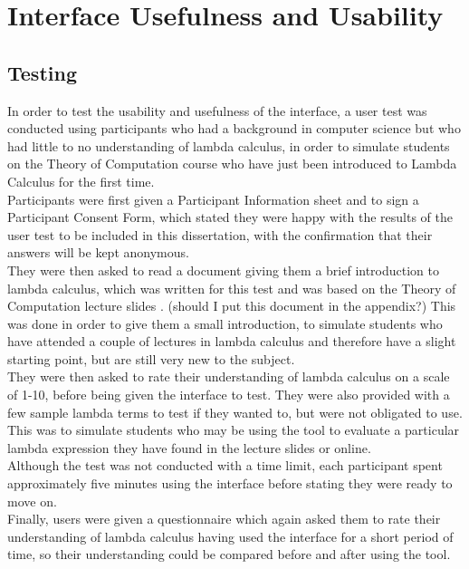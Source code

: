 \documentclass[a4paper,12pt]{report}
\begin{document}
\section{Interface Usefulness and Usability}
\label{interface usefulness and usability}
\subsection{Testing}

In order to test the usability and usefulness of the interface, a user test was conducted using participants who had a background in computer science but who had little to no understanding of lambda calculus, in order to simulate students on the Theory of Computation course who have just been introduced to Lambda Calculus for the first time.\\

Participants were first given a Participant Information sheet and to sign a Participant Consent Form, which stated they were happy with the results of the user test to be included in this dissertation, with the confirmation that their answers will be kept anonymous.\\

They were then asked to read a document giving them a brief introduction to lambda calculus, which was written for this test and was based on the Theory of Computation lecture slides \cite{Gay2019}. (should I put this document in the appendix?) This was done in order to give them a small introduction, to simulate students who have attended a couple of lectures in lambda calculus and therefore have a slight starting point, but are still very new to the subject.\\

They were then asked to rate their understanding of lambda calculus on a scale of 1-10, before being given the interface to test. They were also provided with a few sample lambda terms to test if they wanted to, but were not obligated to use. This was to simulate students who may be using the tool to evaluate a particular lambda expression they have found in the lecture slides or online.\\

Although the test was not conducted with a time limit, each participant spent approximately five minutes using the interface before stating they were ready to move on.\\

Finally, users were given a questionnaire which again asked them to rate their understanding of lambda calculus having used the interface for a short period of time, so their understanding could be compared before and after using the tool.\\
\end{document}
